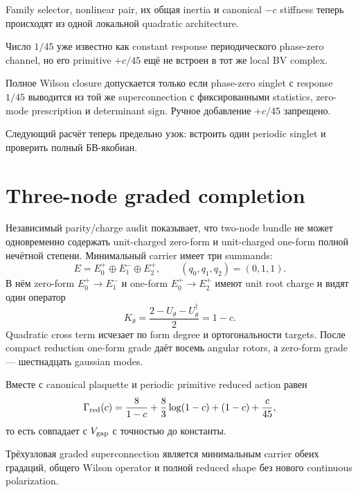 \begin{proposition}
Family selector, nonlinear pair, их общая inertia и canonical \(-c\)
stiffness теперь происходят из одной локальной quadratic architecture.
\end{proposition}

Число \(1/45\) уже известно как constant response периодического phase-zero
channel, но его primitive \(+c/45\) ещё не встроен в тот же local BV
complex.

\begin{nogocriterion}
Полное Wilson closure допускается только если phase-zero singlet с response
\(1/45\) выводится из той же superconnection с фиксированными statistics,
zero-mode prescription и determinant sign. Ручное добавление \(+c/45\)
запрещено.
\end{nogocriterion}

Следующий расчёт теперь предельно узок: встроить один periodic singlet и
проверить полный БВ-якобиан.

\section{Three-node graded completion}

Независимый parity/charge audit показывает, что two-node bundle не может
одновременно содержать unit-charged zero-form и unit-charged one-form полной
нечётной степени. Минимальный carrier имеет три summands:
\begin{equation}
 E=E_0^+\oplus E_1^-\oplus E_2^+,
 \qquad (q_0,q_1,q_2)=(0,1,1).
\end{equation}
В нём zero-form \(E_0^+\to E_1^-\) и one-form \(E_0^+\to E_2^+\)
имеют unit root charge и видят один оператор
\begin{equation}
 K_\theta=\frac{2-U_\theta-U_\theta^\dagger}{2}=1-c.
\end{equation}
Quadratic cross term исчезает по form degree и ортогональности targets.
После compact reduction one-form grade даёт восемь angular rotors, а
zero-form grade --- шестнадцать gaussian modes.

Вместе с canonical plaquette и periodic primitive reduced action равен
\begin{equation}
 \Gamma_{\rm red}(c)
 =\frac8{1-c}+\frac83\log(1-c)+(1-c)+\frac{c}{45},
\end{equation}
то есть совпадает с \(V_{\rm gap}\) с точностью до константы.

\begin{proposition}
Трёхузловая graded superconnection является минимальным carrier обеих
градаций, общего Wilson operator и полной reduced shape без нового
continuous polarization.
\end{proposition}

